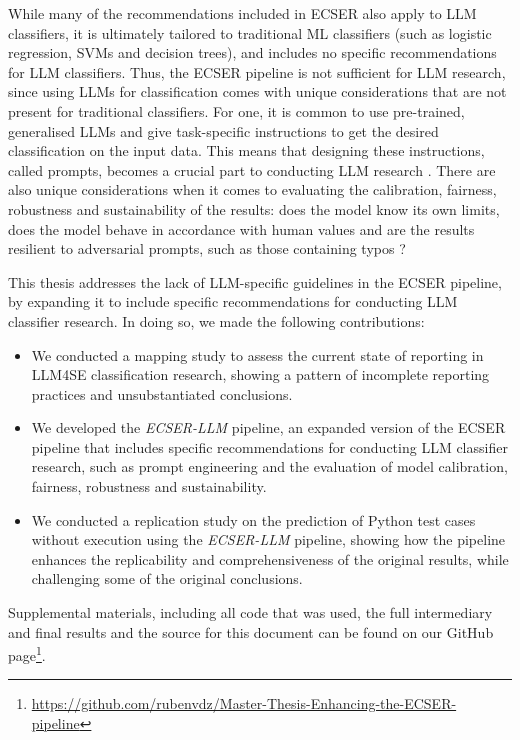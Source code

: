 \documentclass[a4paper]{article}
\newcommand{\newecser}{\textit{ECSER-LLM} }
\begin{document}
While many of the recommendations included in ECSER also apply to LLM classifiers, it is ultimately tailored to traditional ML classifiers (such as logistic regression, SVMs and decision trees), and includes no specific recommendations for LLM classifiers. Thus, the ECSER pipeline is not sufficient for LLM research, since using LLMs for classification comes with unique considerations that are not present for traditional classifiers. For one, it is common to use pre-trained, generalised LLMs and give task-specific instructions to get the desired classification on the input data. This means that designing these instructions, called prompts, becomes a crucial part to conducting LLM research \cite{Marvin2024}. There are also unique considerations when it comes to evaluating the calibration, fairness, robustness and sustainability of the results: does the model know its own limits, does the model behave in accordance with human values and are the results resilient to adversarial prompts, such as those containing typos \cite{Woodworth2017,zhu2024}?

This thesis addresses the lack of LLM-specific guidelines in the ECSER pipeline, by expanding it to include specific recommendations for conducting LLM classifier research. In doing so, we made the following contributions:
\begin{itemize}
    \item We conducted a mapping study to assess the current state of reporting in LLM4SE classification research, showing a pattern of incomplete reporting practices and unsubstantiated conclusions.
    \item We developed the \newecser pipeline, an expanded version of the ECSER pipeline that includes specific recommendations for conducting LLM classifier research, such as prompt engineering and the evaluation of model calibration, fairness, robustness and sustainability.
    \item We conducted a replication study on the prediction of Python test cases without execution using the \newecser pipeline, showing how the pipeline enhances the replicability and comprehensiveness of the original results, while challenging some of the original conclusions.
\end{itemize}

Supplemental materials, including all code that was used, the full intermediary and final results and the source for this document can be found on our GitHub page\footnote{\url{https://github.com/rubenvdz/Master-Thesis-Enhancing-the-ECSER-pipeline}}.\\
\end{document}
